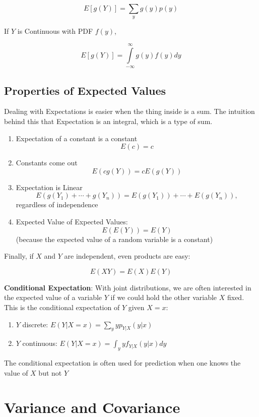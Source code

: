 \documentclass[
]{book}
\providecommand{\tightlist}{%
  \setlength{\itemsep}{0pt}\setlength{\parskip}{0pt}}
\theoremstyle{definition}
\theoremstyle{definition}
\theoremstyle{definition}
\theoremstyle{remark}
\begin{document}
\[E[g(Y)]=\sum\limits_y g(y)p(y)\]

If \(Y\) is Continuous with PDF \(f(y)\),

\[E[g(Y)]=\int\limits_{-\infty}^\infty g(y)f(y)dy\]

\hypertarget{properties-of-expected-values}{%
\subsection*{Properties of Expected Values}\label{properties-of-expected-values}}

Dealing with Expectations is easier when the thing inside is a sum. The intuition behind this that Expectation is an integral, which is a type of sum.

\begin{enumerate}
\def\labelenumi{\arabic{enumi}.}
\tightlist
\item
  Expectation of a constant is a constant \[E(c)=c\]
\item
  Constants come out \[E(c g(Y))= c E(g(Y))\]
\item
  Expectation is Linear \[E(g(Y_1) + \cdots + g(Y_n))=E(g(Y_1)) +\cdots+E(g(Y_n)),\] regardless of independence
\item
  Expected Value of Expected Values: \[E(E(Y)) = E(Y)\] (because the expected value of a random variable is a constant)
\end{enumerate}

Finally, if \(X\) and \(Y\) are independent, even products are easy:

\[E(XY) = E(X)E(Y)\]

\textbf{Conditional Expectation}: With joint distributions, we are often interested in the expected value of a variable \(Y\) if we could hold the other variable \(X\) fixed. This is the conditional expectation of \(Y\) given \(X = x\):

\begin{enumerate}
\def\labelenumi{\arabic{enumi}.}
\tightlist
\item
  \(Y\) discrete: \(E(Y|X = x) = \sum_y yp_{Y|X}(y|x)\)
\item
  \(Y\) continuous: \(E(Y|X = x) = \int_y yf_{Y|X}(y|x)dy\)
\end{enumerate}

The conditional expectation is often used for prediction when one knows the value of \(X\) but not \(Y\)

\hypertarget{variance-and-covariance}{%
\section{Variance and Covariance}\label{variance-and-covariance}}
\end{document}
